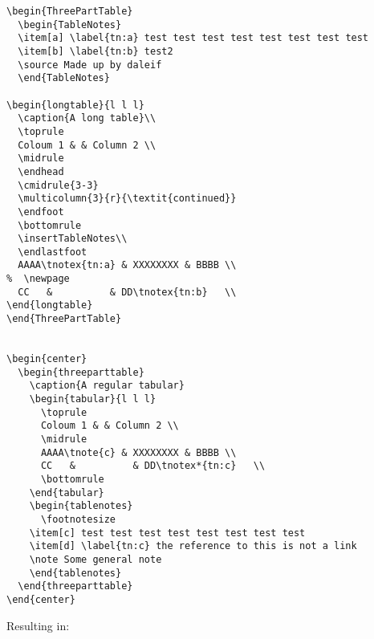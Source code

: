 \documentclass[a4paper,article]{memoir}
\begin{document}
\begin{lstlisting}
\begin{ThreePartTable}
  \begin{TableNotes}
  \item[a] \label{tn:a} test test test test test test test test
  \item[b] \label{tn:b} test2
  \source Made up by daleif
  \end{TableNotes}

\begin{longtable}{l l l}
  \caption{A long table}\\
  \toprule
  Coloum 1 & & Column 2 \\
  \midrule
  \endhead
  \cmidrule{3-3}
  \multicolumn{3}{r}{\textit{continued}}
  \endfoot
  \bottomrule
  \insertTableNotes\\
  \endlastfoot
  AAAA\tnotex{tn:a} & XXXXXXXX & BBBB \\
%  \newpage
  CC   &          & DD\tnotex{tn:b}   \\
\end{longtable}
\end{ThreePartTable}


\begin{center}
  \begin{threeparttable}
    \caption{A regular tabular}
    \begin{tabular}{l l l}
      \toprule
      Coloum 1 & & Column 2 \\
      \midrule
      AAAA\tnote{c} & XXXXXXXX & BBBB \\
      CC   &          & DD\tnotex*{tn:c}   \\
      \bottomrule
    \end{tabular}
    \begin{tablenotes}
      \footnotesize
    \item[c] test test test test test test test test 
    \item[d] \label{tn:c} the reference to this is not a link
    \note Some general note
    \end{tablenotes}
  \end{threeparttable}
\end{center}
\end{lstlisting}

\newpage

\noindent Resulting in:
\end{document}
